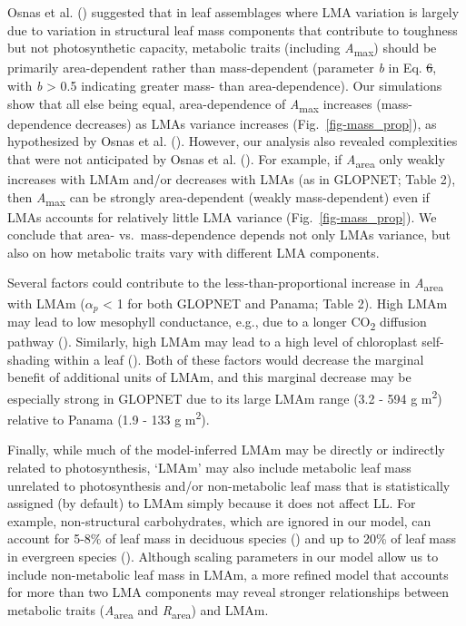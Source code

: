 \documentclass[
  12pt,
  letterpaper,
  DIV=11,
  numbers=noendperiod]{scrartcl}
\providecommand{\DIFadd}[1]{{\protect\color{blue}\uwave{#1}}} %
\providecommand{\DIFdel}[1]{{\protect\color{red}\sout{#1}}}                      %
\providecommand{\DIFaddbegin}{} %
\providecommand{\DIFaddend}{} %
\providecommand{\DIFdelbegin}{} %
\providecommand{\DIFdelend}{} %
\newcommand{\DIFscaledelfig}{0.5}
\newlength{\DIFdelgraphicswidth} %
\newlength{\DIFdelgraphicsheight} %
\newcommand{\DIFaddincludegraphics}[2][]{{\color{blue}\fbox{\DIFOincludegraphics[#1]{#2}}}} %
\newcommand{\DIFdelincludegraphics}[2][]{%
\sbox{\DIFdelgraphicsbox}{\DIFOincludegraphics[#1]{#2}}%
\settoboxwidth{\DIFdelgraphicswidth}{\DIFdelgraphicsbox} %
\settoboxtotalheight{\DIFdelgraphicsheight}{\DIFdelgraphicsbox} %
\scalebox{\DIFscaledelfig}{%
\parbox[b]{\DIFdelgraphicswidth}{\usebox{\DIFdelgraphicsbox}\\[-\baselineskip] \rule{\DIFdelgraphicswidth}{0em}}\llap{\resizebox{\DIFdelgraphicswidth}{\DIFdelgraphicsheight}{%
\setlength{\unitlength}{\DIFdelgraphicswidth}%
\begin{picture}(1,1)%
\thicklines\linethickness{2pt} %
{\color[rgb]{1,0,0}\put(0,0){\framebox(1,1){}}}%
{\color[rgb]{1,0,0}\put(0,0){\line( 1,1){1}}}%
{\color[rgb]{1,0,0}\put(0,1){\line(1,-1){1}}}%
\end{picture}%
}\hspace*{3pt}}} %
} %
\DeclareRobustCommand{\DIFaddbegin}{\DIFOaddbegin \let\includegraphics\DIFaddincludegraphics} %
\DeclareRobustCommand{\DIFaddend}{\DIFOaddend \let\includegraphics\DIFOincludegraphics} %
\DeclareRobustCommand{\DIFdelbegin}{\DIFOdelbegin \let\includegraphics\DIFdelincludegraphics} %
\DeclareRobustCommand{\DIFdelend}{\DIFOaddend \let\includegraphics\DIFOincludegraphics} %
\begin{document}
Osnas et al. () suggested that in leaf
assemblages where LMA variation is largely due to variation in
structural leaf mass components that contribute to toughness but not
photosynthetic capacity, metabolic traits (including
\emph{A}\textsubscript{max}) should be primarily area-dependent rather
than mass-dependent (parameter \emph{b} in Eq. \DIFdelbegin \DIFdel{6}\DIFdelend \DIFaddbegin \DIFadd{5}\DIFaddend , with \emph{b}
\textgreater{} 0.5 indicating greater mass- than area-dependence). Our
simulations show that all else being equal, area-dependence of
\emph{A}\textsubscript{max} increases (mass-dependence decreases) as
LMAs variance increases (Fig.~\ref{fig-mass_prop}), as hypothesized by
Osnas et al. (). However, our analysis
also revealed complexities that were not anticipated by Osnas et al.
(). For example, if
\emph{A}\textsubscript{area} only weakly increases with LMAm and/or
decreases with LMAs (as in GLOPNET; Table 2), then
\emph{A}\textsubscript{max} can be strongly area-dependent (weakly
mass-dependent) even if LMAs accounts for relatively little LMA variance
(Fig.~\ref{fig-mass_prop}). We conclude that area- vs.~mass-dependence
depends not only LMAs variance, but also on how metabolic traits vary
with different LMA components.

Several factors could contribute to the less-than-proportional increase
in \emph{A}\textsubscript{area} with LMAm (\(\alpha_p\) \textless{} 1
for both GLOPNET and Panama; Table 2). High LMAm may lead to low
mesophyll conductance, e.g., due to a longer CO\textsubscript{2}
diffusion pathway ().
Similarly, high LMAm may lead to a high level of chloroplast
self-shading within a leaf (). Both of these factors would decrease the marginal benefit
of additional units of LMAm, and this marginal decrease may be
especially strong in GLOPNET due to its large LMAm range (3.2 - 594 g
m\textsuperscript{2}) relative to Panama (1.9 - 133 g
m\textsuperscript{2}).

Finally, while much of the model-inferred LMAm may be directly or
indirectly related to photosynthesis, `LMAm' may also include metabolic
leaf mass unrelated to photosynthesis and/or non-metabolic leaf mass
that is statistically assigned (by default) to LMAm simply because it
does not affect LL. For example, non-structural carbohydrates, which are
ignored in our model, can account for 5-8\% of leaf mass in deciduous
species () and up to 20\% of
leaf mass in evergreen species
().
Although scaling parameters in our model allow us to include
non-metabolic leaf mass in LMAm, a more refined model that accounts for
more than two LMA components may reveal stronger relationships between
metabolic traits (\emph{A}\textsubscript{area} and
\emph{R}\textsubscript{area}) and LMAm.
\end{document}
